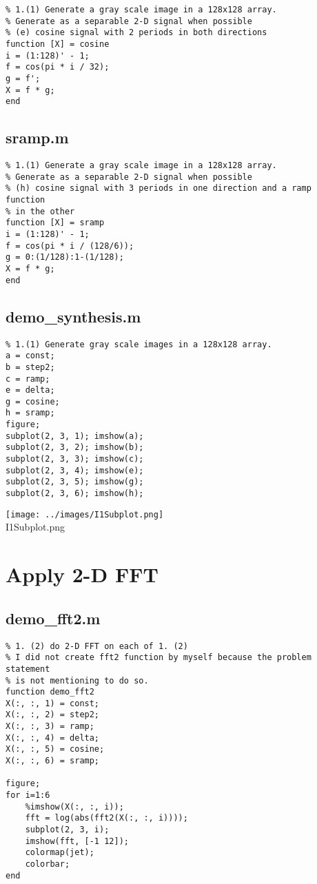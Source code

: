 \documentclass[article,oneside]{memoir}
\begin{document}
\begin{verbatim}
% 1.(1) Generate a gray scale image in a 128x128 array. 
% Generate as a separable 2-D signal when possible
% (e) cosine signal with 2 periods in both directions
function [X] = cosine
i = (1:128)' - 1;
f = cos(pi * i / 32);
g = f';
X = f * g;
end
\end{verbatim}

\subsection{sramp.m}

\begin{verbatim}
% 1.(1) Generate a gray scale image in a 128x128 array. 
% Generate as a separable 2-D signal when possible
% (h) cosine signal with 3 periods in one direction and a ramp function 
% in the other
function [X] = sramp
i = (1:128)' - 1;
f = cos(pi * i / (128/6));
g = 0:(1/128):1-(1/128);
X = f * g;
end
\end{verbatim}

\newpage

\subsection{demo\_synthesis.m}

\begin{verbatim}
% 1.(1) Generate gray scale images in a 128x128 array. 
a = const;
b = step2;
c = ramp;
e = delta;
g = cosine;
h = sramp;
figure;
subplot(2, 3, 1); imshow(a);
subplot(2, 3, 2); imshow(b);
subplot(2, 3, 3); imshow(c);
subplot(2, 3, 4); imshow(e);
subplot(2, 3, 5); imshow(g);
subplot(2, 3, 6); imshow(h);
\end{verbatim}

\begin{center}
\texttt{[image: ../images/I1Subplot.png]}\\
I1Subplot.png
\end{center}

\newpage

\section{Apply 2-D FFT}

\subsection{demo\_fft2.m}

\begin{verbatim}
% 1. (2) do 2-D FFT on each of 1. (2)
% I did not create fft2 function by myself because the problem statement 
% is not mentioning to do so. 
function demo_fft2
X(:, :, 1) = const;
X(:, :, 2) = step2;
X(:, :, 3) = ramp;
X(:, :, 4) = delta;
X(:, :, 5) = cosine;
X(:, :, 6) = sramp;

figure;
for i=1:6
    %imshow(X(:, :, i));
    fft = log(abs(fft2(X(:, :, i))));
    subplot(2, 3, i);
    imshow(fft, [-1 12]);
    colormap(jet);
    colorbar;
end
\end{verbatim}
\end{document}
